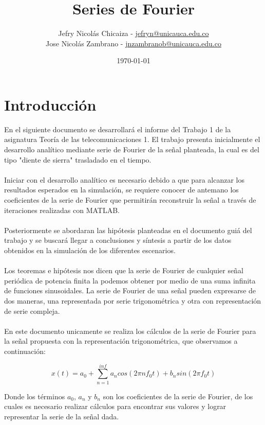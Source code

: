 \documentclass[12pt]{article}
\date{\today}.
\title{\textbf{Series de Fourier}}
\author{
    Jefry Nicolás Chicaiza - \url{jefryn@unicauca.edu.co}\\
    Jose Nicolás Zambrano - \url{jnzambranob@unicauca.edu.co}
}
\date{}
\begin{document}
\maketitle
\thispagestyle{fancy}
\section*{Introducción}
    En el siguiente documento se desarrollará el informe del Trabajo 1 de la asignatura 
    Teoría de las telecomunicaciones 1. El trabajo presenta inicialmente el desarrollo 
    analítico mediante serie de Fourier de la señal planteada, la cual es del tipo 
    "diente de sierra"  trasladado en el tiempo.\\
    \\
    Iniciar con el desarrollo analítico es necesario debido a que para alcanzar los 
    resultados esperados en la simulación, se requiere conocer de antemano los coeficientes 
    de la serie de Fourier que permitirán reconstruir la señal a través de iteraciones 
    realizadas con MATLAB.\\
    \\
    Posteriormente se abordaran las hipótesis planteadas en el documento guiá del trabajo 
    y se buscará llegar a conclusiones y síntesis a partir de los datos obtenidos en la 
    simulación de los diferentes escenarios.\\
    \\
    Los teoremas e hipótesis nos dicen que la serie de Fourier de cualquier señal periódica de potencia 
    finita la podemos obtener por medio de una suma infinita de funciones sinusoidales. La serie de 
    Fourier de una señal pueden expresarse de dos maneras, una representada por serie trigonométrica y 
    otra con representación de serie compleja.\\ 
    \\
    En este documento unicamente se realiza los cálculos de la serie de Fourier para la señal propuesta 
    con la representación trigonométrica, que observamos a continuación:

    \begin{equation}
        x(t)=a_{0}+\sum_{n=1}^{inf} a_{n}cos(2\pi nf_{0}t)+b_{n}sin(2\pi f_{0}t)
        \label{equation1}
    \end{equation}
    
    Donde los términos $a_{0}$, $a_{n}$ y $b_{n}$ son los coeficientes de la serie de Fourier, de los cuales
    es necesario realizar cálculos para encontrar sus valores y lograr representar la serie de la señal dada.
\end{document}
